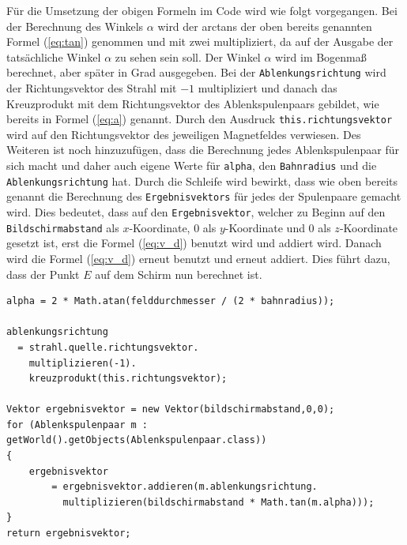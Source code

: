 Für die Umsetzung der obigen Formeln im Code wird wie folgt vorgegangen. 
Bei der Berechnung des Winkels $\alpha$ wird der arctans der oben bereits genannten Formel (\ref{eq:tan}) genommen und mit zwei multipliziert, da auf der Ausgabe der tatsächliche Winkel $\alpha$ zu sehen sein soll.
Der Winkel $\alpha$ wird im Bogenmaß berechnet, aber später in Grad ausgegeben.
Bei der \lstinline$Ablenkungsrichtung$ wird der Richtungsvektor des Strahl mit $-1$ multipliziert und danach das Kreuzprodukt mit dem Richtungsvektor des Ablenkspulenpaars gebildet, wie bereits in Formel (\ref{eq:a}) genannt.
Durch den Ausdruck \lstinline$this.richtungsvektor$ wird auf den Richtungsvektor des jeweiligen Magnetfeldes verwiesen.
Des Weiteren ist noch hinzuzufügen, dass die Berechnung jedes Ablenkspulenpaar für sich macht und daher auch eigene Werte für \lstinline$alpha$, den \lstinline$Bahnradius$ und die \lstinline$Ablenkungsrichtung$ hat.
Durch die Schleife wird bewirkt, dass wie oben bereits genannt die Berechnung des \lstinline$Ergebnisvektors$ für jedes der Spulenpaare gemacht wird.
Dies bedeutet, dass auf den \lstinline$Ergebnisvektor$, welcher zu Beginn auf den \lstinline$Bildschirmabstand$ als $x$-Koordinate, $0$ als $y$-Koordinate und 0 als $z$-Koordinate gesetzt ist, erst die Formel (\ref{eq:v_d}) benutzt wird und addiert wird.
Danach wird die Formel (\ref{eq:v_d}) erneut benutzt und erneut addiert. Dies führt dazu, dass der Punkt $E$ auf dem Schirm nun berechnet ist.

\begin{lstlisting}
alpha = 2 * Math.atan(felddurchmesser / (2 * bahnradius));

ablenkungsrichtung
  = strahl.quelle.richtungsvektor.
    multiplizieren(-1).
    kreuzprodukt(this.richtungsvektor);

Vektor ergebnisvektor = new Vektor(bildschirmabstand,0,0);
for (Ablenkspulenpaar m : getWorld().getObjects(Ablenkspulenpaar.class))
{
    ergebnisvektor
        = ergebnisvektor.addieren(m.ablenkungsrichtung.
          multiplizieren(bildschirmabstand * Math.tan(m.alpha)));
}
return ergebnisvektor;
\end{lstlisting}

     
